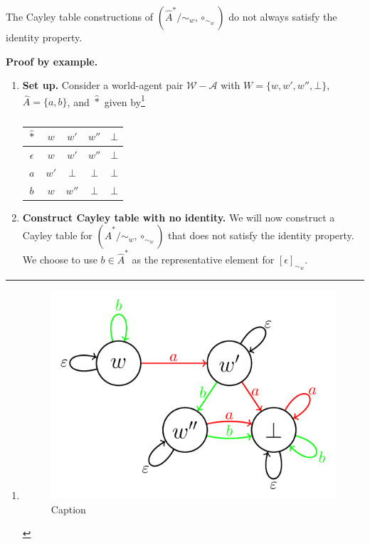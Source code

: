 \begin{propositionE}
    The Cayley table constructions of $(\hat{A}^{*}/\sim_{w}, \circ_{\sim_{w}})$ do not always satisfy the identity property.
\end{propositionE}
\begin{proofE}
\textbf{Proof by example.}
\begin{enumerate}
    \item \textbf{Set up.}
        Consider a world-agent pair $\mathscr{W}-\mathscr{A}$ with $W = \{ w, w', w'', \bot \}$, $\hat{A} = \{a, b\}$, and $\hat{\ast}$ given by\footnote{
        \begin{figure}[H]
            \includegraphics[width=0.5\linewidth]{6BeyondSBDRLLocalAlgebras/Images/cayley_table_constructions_dont_always_satisfy_identity.png}
            \caption{Caption}
        \end{figure}
        }
        \begin{table}[H]
            \centering
            \begin{tabular}{c|cccc}
                $\hat{\ast}$   & $w$       & $w'$      & $w''$     & $\bot$ \\
                \hline
                $\epsilon$      & $w$       & $w'$      & $w''$     & $\bot$ \\
                $a$             & $w'$      & $\bot$    & $\bot$    & $\bot$ \\
                $b$             & $w$       & $w''$     & $\bot$    & $\bot$
            \end{tabular}
            \caption{
            }
        \end{table}
    \item \textbf{Construct Cayley table with no identity.}
    We will now construct a Cayley table for $(\hat{A}^{*}/\sim_{w}, \circ_{\sim_{w}})$ that does not satisfy the identity property.
    We choose to use $b \in \hat{A}^{*}$ as the representative element for $[\epsilon]_{\sim_{w}}$.

\end{enumerate}
\end{proofE}
